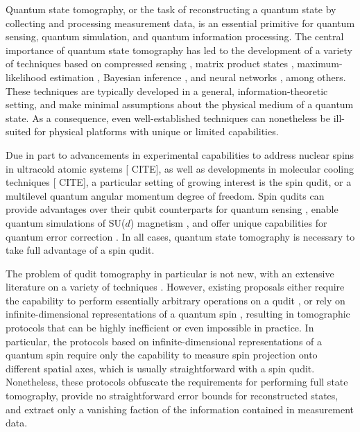 \documentclass[notitlepage,twocolumn]{revtex4-2}
\newcommand{\1}{\mathds{1}}
\newcommand{\red}[1]{{\color{red} #1}}
\begin{document}
Quantum state tomography, or the task of reconstructing a quantum state by collecting and processing measurement data, is an essential primitive for quantum sensing, quantum simulation, and quantum information processing.
The central importance of quantum state tomography has led to the development of a variety of techniques based on compressed sensing \cite{gross2010quantum}, matrix product states \cite{cramer2010efficient}, %
maximum-likelihood estimation \cite{smolin2012efficient}, %
Bayesian inference \cite{huszar2012adaptive}, and neural networks \cite{torlai2018neuralnetwork}, among others.
These techniques are typically developed in a general, information-theoretic setting, and make minimal assumptions about the physical medium of a quantum state.
As a consequence, even well-established techniques can nonetheless be ill-suited for physical platforms with unique or limited capabilities.

Due in part to advancements in experimental capabilities to address nuclear spins in ultracold atomic systems [\red{CITE}], as well as developments in molecular cooling techniques [\red{CITE}], a particular setting of growing interest is the spin qudit, or a multilevel quantum angular momentum degree of freedom.
Spin qudits can provide advantages over their qubit counterparts for quantum sensing \cite{evrard2019enhanced}, enable quantum simulations of SU($d$) magnetism \cite{banerjee2013atomic, cazalilla2014ultracold}, and offer unique capabilities for quantum error correction \cite{albert2020robust, gross2020encoding}.
In all cases, quantum state tomography is necessary to take full advantage of a spin qudit.

The problem of qudit tomography in particular is not new, with an extensive literature on a variety of techniques \cite{manko1997spin, thew2002qudit, flammia2005minimal, salazar2012quantum, sosa-martinez2017quantum, ha2018minimal, evrard2019enhanced, stefano2019set, palici2020oam}.
However, existing proposals either require the capability to perform essentially arbitrary operations on a qudit \cite{thew2002qudit, flammia2005minimal, salazar2012quantum, sosa-martinez2017quantum, ha2018minimal, stefano2019set, palici2020oam}, or rely on infinite-dimensional representations of a quantum spin \cite{manko1997spin, evrard2019enhanced}, resulting in tomographic protocols that can be highly inefficient or even impossible in practice.
In particular, the protocols based on infinite-dimensional representations of a quantum spin require only the capability to measure spin projection onto different spatial axes, which is usually straightforward with a spin qudit.
Nonetheless, these protocols obfuscate the requirements for performing full state tomography, provide no straightforward error bounds for reconstructed states, and extract only a vanishing faction of the information contained in measurement data.
\end{document}
